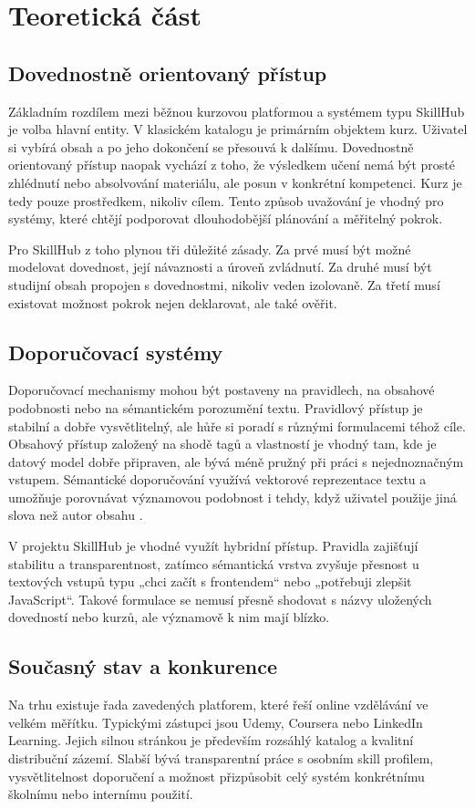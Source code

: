 \documentclass[12pt,a4paper]{report}
\begin{document}
\chapter{Teoretická část}
\section{Dovednostně orientovaný přístup}
Základním rozdílem mezi běžnou kurzovou platformou a systémem typu SkillHub je volba hlavní entity. V klasickém katalogu je primárním objektem kurz. Uživatel si vybírá obsah a po jeho dokončení se přesouvá k dalšímu. Dovednostně orientovaný přístup naopak vychází z toho, že výsledkem učení nemá být prosté zhlédnutí nebo absolvování materiálu, ale posun v konkrétní kompetenci. Kurz je tedy pouze prostředkem, nikoliv cílem. Tento způsob uvažování je vhodný pro systémy, které chtějí podporovat dlouhodobější plánování a měřitelný pokrok.

Pro SkillHub z toho plynou tři důležité zásady. Za prvé musí být možné modelovat dovednost, její návaznosti a úroveň zvládnutí. Za druhé musí být studijní obsah propojen s dovednostmi, nikoliv veden izolovaně. Za třetí musí existovat možnost pokrok nejen deklarovat, ale také ověřit.

\section{Doporučovací systémy}
Doporučovací mechanismy mohou být postaveny na pravidlech, na obsahové podobnosti nebo na sémantickém porozumění textu. Pravidlový přístup je stabilní a dobře vysvětlitelný, ale hůře si poradí s různými formulacemi téhož cíle. Obsahový přístup založený na shodě tagů a vlastností je vhodný tam, kde je datový model dobře připraven, ale bývá méně pružný při práci s nejednoznačným vstupem. Sémantické doporučování využívá vektorové reprezentace textu a umožňuje porovnávat významovou podobnost i tehdy, když uživatel použije jiná slova než autor obsahu \cite{reimers,fastapi}.

V projektu SkillHub je vhodné využít hybridní přístup. Pravidla zajišťují stabilitu a transparentnost, zatímco sémantická vrstva zvyšuje přesnost u textových vstupů typu „chci začít s frontendem“ nebo „potřebuji zlepšit JavaScript“. Takové formulace se nemusí přesně shodovat s názvy uložených dovedností nebo kurzů, ale významově k nim mají blízko.

\section{Současný stav a konkurence}
Na trhu existuje řada zavedených platforem, které řeší online vzdělávání ve velkém měřítku. Typickými zástupci jsou Udemy, Coursera nebo LinkedIn Learning. Jejich silnou stránkou je především rozsáhlý katalog a kvalitní distribuční zázemí. Slabší bývá transparentní práce s osobním skill profilem, vysvětlitelnost doporučení a možnost přizpůsobit celý systém konkrétnímu školnímu nebo internímu použití.
\end{document}
